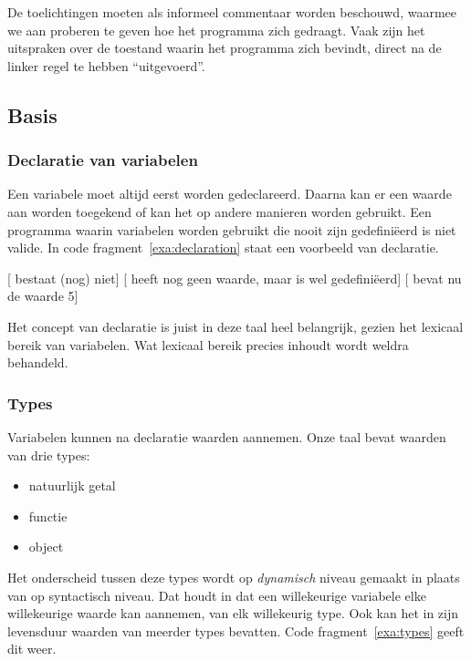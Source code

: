 De toelichtingen moeten als informeel commentaar worden beschouwd, waarmee we aan proberen te geven hoe het programma zich gedraagt. Vaak zijn het uitspraken over de toestand waarin het programma zich bevindt, direct na de linker regel te hebben ``uitgevoerd''.

\subsection{Basis}

\subsubsection{Declaratie van variabelen}

Een variabele moet altijd eerst worden gedeclareerd. Daarna kan er een waarde aan worden toegekend of kan het op andere manieren worden gebruikt. Een programma waarin variabelen worden gebruikt die nooit zijn gedefiniëerd is niet valide. In code fragment~\ref{exa:declaration} staat een voorbeeld van declaratie.

\begin{NoBreak}
\codeFragmentCaption
\begin{codelines}
  \codeLine{}[ bestaat (nog) niet]
  [ heeft nog geen waarde, maar is wel gedefiniëerd]
  [ bevat nu de waarde 5]
\end{codelines}
\end{NoBreak}

Het concept van declaratie is juist in deze taal heel belangrijk, gezien het lexicaal bereik van variabelen. Wat lexicaal bereik precies inhoudt wordt weldra behandeld.

\subsubsection{Types}
\label{subsec:taal-types}

Variabelen kunnen na declaratie waarden aannemen. Onze taal bevat waarden van drie types:
\begin{itemize}
  \item natuurlijk getal
  \item functie
  \item object
\end{itemize}%
Het onderscheid tussen deze types wordt op \emph{dynamisch} niveau gemaakt in plaats van op syntactisch niveau. Dat houdt in dat een willekeurige variabele elke willekeurige waarde kan aannemen, van elk willekeurig type. Ook kan het in zijn levensduur waarden van meerder types bevatten. Code fragment~\ref{exa:types} geeft dit weer.


